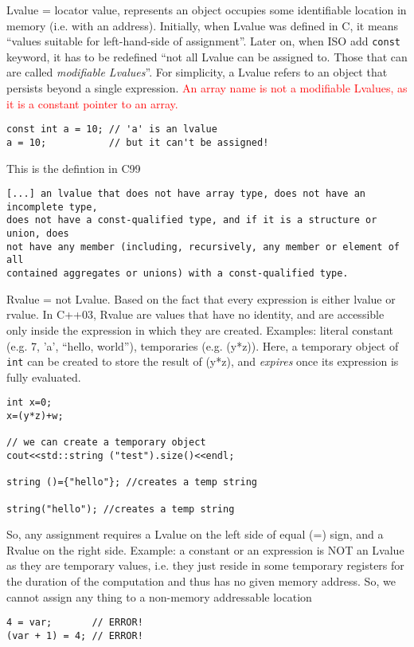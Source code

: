 Lvalue = locator value, represents an object occupies some identifiable location
in memory (i.e. with an address). Initially, when Lvalue was defined in C, it
means ``values suitable for left-hand-side of assignment''. Later on, when ISO
add \verb!const! keyword, it has to be redefined ``not all Lvalue can be
assigned to. Those that can are called {\it modifiable Lvalues}''.  For
simplicity, a Lvalue refers to an object that persists beyond a single
expression. \textcolor{red}{An array name is not a modifiable Lvalues, as it is
a constant pointer to an array.}

\begin{verbatim}
const int a = 10; // 'a' is an lvalue
a = 10;           // but it can't be assigned!
\end{verbatim}
This is the defintion in C99
{\small
\begin{verbatim}
[...] an lvalue that does not have array type, does not have an incomplete type,
does not have a const-qualified type, and if it is a structure or union, does
not have any member (including, recursively, any member or element of all
contained aggregates or unions) with a const-qualified type.  
\end{verbatim}
}

Rvalue = not Lvalue. Based on the fact that every expression is either lvalue or
rvalue. In C++03, Rvalue are values that have no identity, and are accessible
only inside the expression in which they are created. Examples: literal constant
(e.g. 7, 'a', ``hello, world''), temporaries (e.g. (y*z)). Here, a temporary
object of \verb!int! can be created to store the result of (y*z), and {\it
expires} once its expression is fully evaluated.
\begin{verbatim}
int x=0;
x=(y*z)+w;

// we can create a temporary object
cout<<std::string ("test").size()<<endl;

string ()={"hello"}; //creates a temp string

string("hello"); //creates a temp string
\end{verbatim}

So, any assignment requires a Lvalue on the left side of equal (=) sign, and a
Rvalue on the right side. Example: a constant or an expression is NOT an Lvalue
as they are temporary values, i.e. they just reside in some temporary registers
for the duration of the computation and thus has no given memory address. So, we
cannot assign any thing to a non-memory addressable location
\begin{verbatim}
4 = var;       // ERROR!
(var + 1) = 4; // ERROR!
\end{verbatim}

